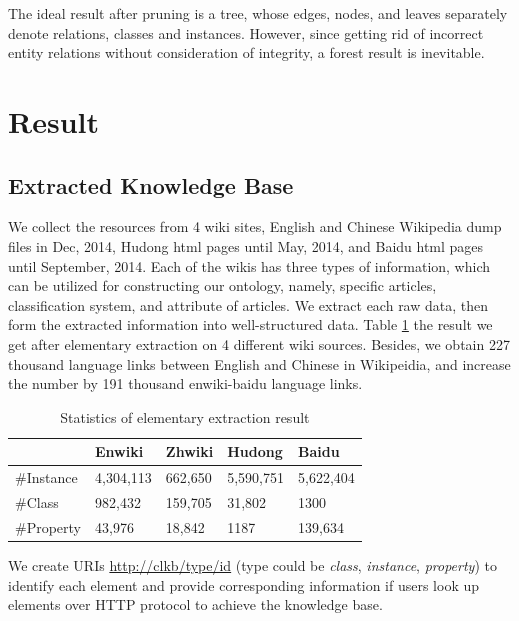 \documentclass[runningheads,a4paper]{llncs}
\begin{document}
\begin{CJK*}{UTF8}{song}
The ideal result after pruning is a tree, whose edges, nodes, and leaves separately denote relations, classes and instances. However, since getting rid of incorrect entity relations without consideration of integrity, a forest result is inevitable.

\section{Result}
\label{sec:result}

\subsection{Extracted Knowledge Base}
We collect the resources from 4 wiki sites, English and Chinese Wikipedia dump files in Dec, 2014, Hudong html pages until May, 2014, and Baidu html pages until September, 2014. Each of the wikis has three types of information, which can be utilized for constructing our ontology, namely, specific articles, classification system, and attribute of articles. We extract each raw data, then form the extracted information into well-structured data. Table \ref{tab:extract-result} the result we get after elementary extraction on 4 different wiki sources. Besides, we obtain 227 thousand language links between English and Chinese in Wikipeidia, and increase the number by 191 thousand enwiki-baidu language links.
\vspace{-0.5cm}
\begin{table}[hb]
    \small
    \centering
    \caption{Statistics of elementary extraction result}
    \label{tab:extract-result}
        \begin{tabular}{|l|l|l|l|l|}
            \hline
                       & Enwiki  & Zhwiki & Hudong  & Baidu   \\ \hline
            \#Instance & 4,304,113 & 662,650 & 5,590,751 & 5,622,404 \\ \hline
            \#Class    & 982,432  & 159,705 & 31,802   & 1300    \\ \hline
            \#Property & 43,976   & 18,842  & 1187    & 139,634  \\ \hline
        \end{tabular}
\end{table}

We create URIs \url{http://clkb/type/id} (type could be \textit{class}, \textit{instance}, \textit{property}) to identify each element and provide corresponding information if users look up elements over HTTP protocol to achieve the knowledge base.


\end{CJK*}
\end{document}
